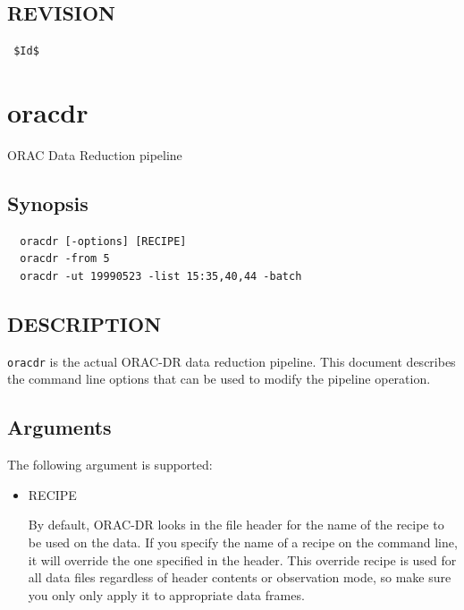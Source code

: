 \documentclass[twoside,11pt]{article}
\renewcommand{\_}{\texttt{\symbol{95}}}
\begin{document}
\subsection*{REVISION\label{Xoracdr_REVISION}}
\begin{verbatim}
 $Id$
\end{verbatim}

\section{oracdr\label{oracdr}}


ORAC Data Reduction pipeline

\subsection*{Synopsis\label{oracdr_Synopsis}}
\begin{verbatim}
  oracdr [-options] [RECIPE]
  oracdr -from 5
  oracdr -ut 19990523 -list 15:35,40,44 -batch
\end{verbatim}
\subsection*{DESCRIPTION\label{oracdr_DESCRIPTION}}


\texttt{oracdr} is the actual ORAC-DR data reduction pipeline.
This document describes the command line options that
can be used to modify the pipeline operation.

\subsection*{Arguments\label{oracdr_Arguments}}


The following argument  is  supported:

\begin{itemize}

\item RECIPE

By default, ORAC-DR looks in the file header for the name of the
recipe to be used on the data. If you specify the name of a recipe on
the command line, it will override the one specified in the
header. This override recipe is used for all data files regardless of
header contents or observation mode, so make sure you only only apply
it to appropriate data frames.

\end{itemize}
\end{document}
